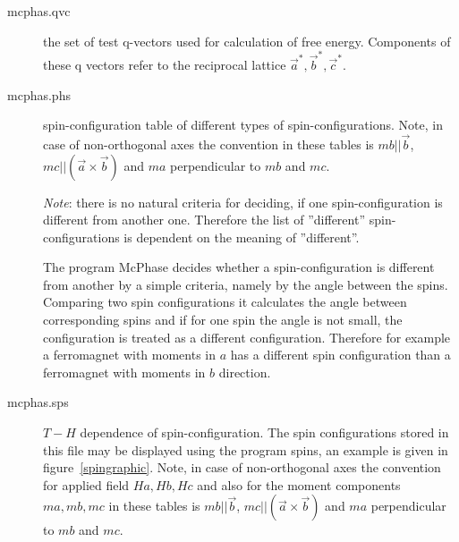 \begin{description}
\item [\prg mcphas.qvc]    the set of test q-vectors used for calculation of free energy.
                           Components of these q vectors refer to the reciprocal lattice $\vec a^*,\vec b^*,\vec c^*$.
\item [\prg mcphas.phs]    spin-configuration table of different types of spin-configurations. 
                            Note, in case of non-orthogonal axes the convention in these tables 
                            is $mb||\vec b$, $mc||(\vec a \times \vec b)$ and $ma$ perpendicular to $mb$ and $mc$.

                           {\em Note}: 
                           there is no natural criteria for deciding, if one spin-configuration is
			   different from another one. Therefore the list of ''different''
			   spin-configurations is dependent on the meaning of ''different''.
			   
			   The program {\prg McPhase} decides whether a spin-configuration is
			   different from another by a simple criteria, namely by the
			   angle between the spins. Comparing two spin configurations it calculates
			   the angle between corresponding spins and if for one spin the
			   angle is not small, the configuration is treated as a different
			   configuration. Therefore for example a ferromagnet with moments
			   in $a$ has a different spin configuration than a ferromagnet with
			   moments in $b$ direction. 
\item [\prg mcphas.sps]    $T-H$ dependence of spin-configuration. The spin configurations stored in this
                           file may be displayed using the program {\prg spins}, an example is given
			   in figure~\ref{spingraphic}.
                            Note, in case of non-orthogonal axes the convention for applied field $Ha, Hb,Hc$ and
                            also for the moment components $ma, mb, mc$ in these tables 
                            is $mb||\vec b$, $mc||(\vec a \times \vec b)$ and $ma$ perpendicular to $mb$ and $mc$.


\end{description}
